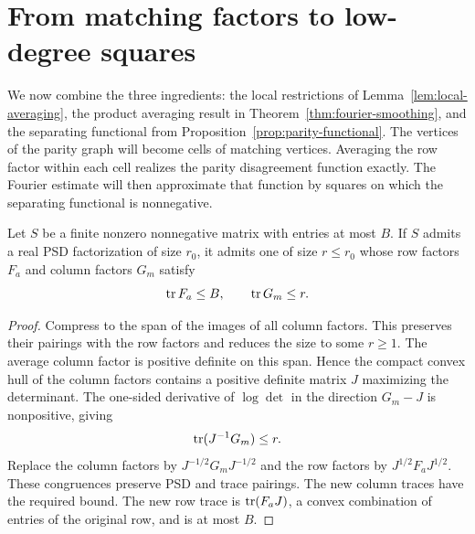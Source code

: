 \section{From matching factors to low-degree squares}
\label{sec:matching}

We now combine the three ingredients: the local restrictions of
Lemma~\ref{lem:local-averaging}, the product averaging result in
Theorem~\ref{thm:fourier-smoothing}, and the separating functional from
Proposition~\ref{prop:parity-functional}.  The vertices of the parity
graph will become cells of matching vertices.  Averaging the row factor
within each cell realizes the parity disagreement function exactly.
The Fourier estimate will then approximate that function by squares
on which the separating functional is nonnegative.

\begin{lemma}
\label{lem:normalization}
Let $S$ be a finite nonzero nonnegative matrix with entries at most $B$.
If $S$ admits a real PSD factorization of size $r_0$, it admits one
of size $r\le r_0$ whose row factors $F_a$ and column factors $G_m$
satisfy
\[
 \operatorname{tr} F_a\le B,\qquad \operatorname{tr} G_m\le r.
\]
\end{lemma}
\begin{proof}
Compress to the span of the images of all column factors.  This
preserves their pairings with the row factors and reduces the size
to some $r\ge1$.  The average column factor is positive definite on
this span.  Hence the compact convex hull of the column factors
contains a positive definite matrix $J$ maximizing the determinant.
The one-sided derivative of $\log\det$ in the direction $G_m-J$
is nonpositive, giving
\[
 \operatorname{tr}(J^{-1}G_m)\le r.
\]
Replace the column factors by $J^{-1/2}G_mJ^{-1/2}$ and the row
factors by $J^{1/2}F_aJ^{1/2}$.  These congruences preserve PSD and
trace pairings.  The new column traces have the required bound.
The new row trace is $\operatorname{tr}(F_aJ)$, a convex combination of entries
of the original row, and is at most $B$.
\end{proof}

